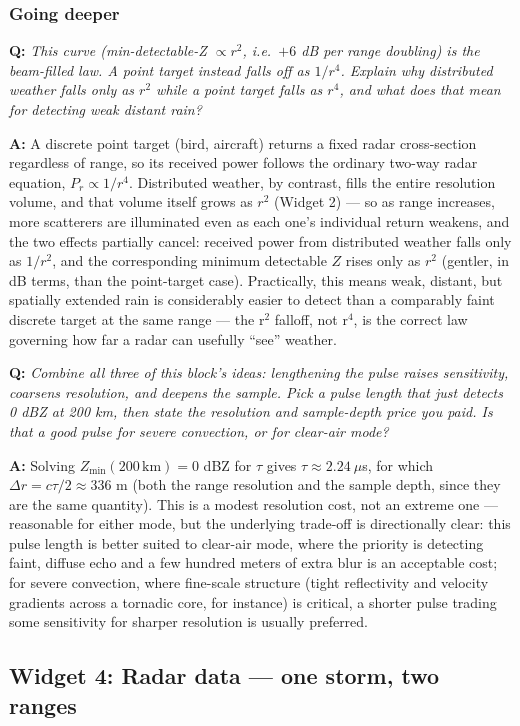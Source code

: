 \documentclass[11pt]{article}
\newenvironment{qa}[1]{\par\noindent\textbf{\color{qgray}Q: }\emph{#1}\par\noindent\textbf{A: }}{\par\vspace{6pt}}
\newcommand{\tier}[1]{\subsubsection*{#1}}
\begin{document}
\tier{Going deeper}
\begin{qa}{This curve (min-detectable-Z $\propto r^2$, i.e.\ $+6$ dB per range doubling) is the \emph{beam-filled} law. A point target instead falls off as $1/r^4$. Explain why distributed weather falls only as $r^2$ while a point target falls as $r^4$, and what does that mean for detecting weak distant rain?}
A discrete point target (bird, aircraft) returns a fixed radar cross-section regardless of range, so its received power follows the ordinary two-way radar equation, $P_r\propto1/r^4$. Distributed weather, by contrast, fills the entire resolution volume, and that volume itself grows as $r^2$ (Widget 2) --- so as range increases, more scatterers are illuminated even as each one's individual return weakens, and the two effects partially cancel: received power from distributed weather falls only as $1/r^2$, and the corresponding minimum detectable $Z$ rises only as $r^2$ (gentler, in dB terms, than the point-target case). Practically, this means weak, distant, but spatially extended rain is considerably easier to detect than a comparably faint discrete target at the same range --- the r$^2$ falloff, not r$^4$, is the correct law governing how far a radar can usefully ``see'' weather.
\end{qa}
\begin{qa}{Combine all three of this block's ideas: lengthening the pulse raises sensitivity, coarsens resolution, and deepens the sample. Pick a pulse length that just detects 0 dBZ at 200 km, then state the resolution and sample-depth price you paid. Is that a good pulse for severe convection, or for clear-air mode?}
Solving $Z_{\min}(200\,\mathrm{km})=0$ dBZ for $\tau$ gives $\tau\approx2.24\ \mu$s, for which $\Delta r=c\tau/2\approx336$ m (both the range resolution and the sample depth, since they are the same quantity). This is a modest resolution cost, not an extreme one --- reasonable for either mode, but the underlying trade-off is directionally clear: this pulse length is better suited to clear-air mode, where the priority is detecting faint, diffuse echo and a few hundred meters of extra blur is an acceptable cost; for severe convection, where fine-scale structure (tight reflectivity and velocity gradients across a tornadic core, for instance) is critical, a shorter pulse trading some sensitivity for sharper resolution is usually preferred.
\end{qa}

\subsection{Widget 4: Radar data --- one storm, two ranges}
\end{document}
